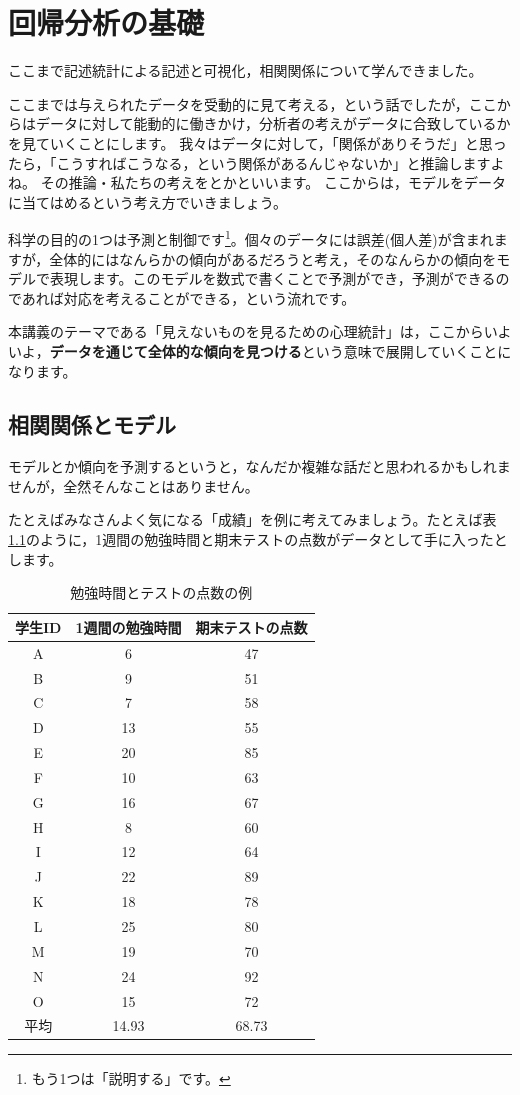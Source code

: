 \documentclass{ltjbook}
\begin{document}
\chapter{回帰分析の基礎}
\label{ch07_Regression}

ここまで記述統計による記述と可視化，相関関係について学んできました。

ここまでは与えられたデータを受動的に見て考える，という話でしたが，ここからはデータに対して能動的に働きかけ，分析者の考えがデータに合致しているかを見ていくことにします。
我々はデータに対して，「関係がありそうだ」と思ったら，「こうすればこうなる，という関係があるんじゃないか」と推論しますよね。
その推論・私たちの考えをとかといいます。
ここからは，モデルをデータに当てはめるという考え方でいきましょう。

科学の目的の1つは予測と制御です\footnote{もう1つは「説明する」です。}。個々のデータには誤差(個人差)が含まれますが，全体的にはなんらかの傾向があるだろうと考え，そのなんらかの傾向をモデルで表現します。このモデルを数式で書くことで予測ができ，予測ができるのであれば対応を考えることができる，という流れです。

本講義のテーマである「見えないものを見るための心理統計」は，ここからいよいよ，\textbf{データを通じて全体的な傾向を見つける}という意味で展開していくことになります。

\section{相関関係とモデル}
モデルとか傾向を予測するというと，なんだか複雑な話だと思われるかもしれませんが，全然そんなことはありません。

たとえばみなさんよく気になる「成績」を例に考えてみましょう。たとえば表\ref{tbl:07_01}のように，1週間の勉強時間と期末テストの点数がデータとして手に入ったとします。

\begin{table}[ht]
	\caption{勉強時間とテストの点数の例}
	\centering
	\begin{tabular}[t]{ccc}
		\hline
		学生ID & 1週間の勉強時間 & 期末テストの点数 \\\hline
		A & 6 & 47 \\
		B & 9 & 51 \\
		C & 7 & 58 \\
		D & 13 & 55 \\
		E & 20 & 85 \\
		F & 10 & 63 \\
		G & 16 & 67 \\
		H & 8 & 60 \\
		I & 12 & 64 \\
		J & 22 & 89 \\
		K & 18 & 78 \\
		L & 25 & 80 \\
		M & 19 & 70 \\
		N & 24 & 92 \\
		O & 15 & 72 \\\hline
		平均 & 14.93 & 68.73 \\
	\end{tabular}
	\label{tbl:07_01}
\end{table}
\end{document}
